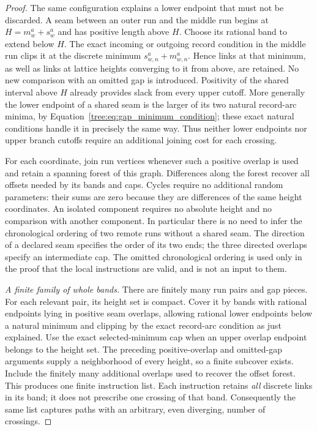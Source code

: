 \begin{proof}


The same configuration explains a lower endpoint that must not be
discarded.  A seam between an outer run and the middle run begins
at $H=m_w^a+s_w^a$ and has positive length above $H$.  Choose its
rational band to extend below $H$.  The exact incoming or outgoing
record condition in the middle run clips it at the discrete minimum
$s_{w,n}^a+m_{w,n}^a$.  Hence links at that minimum, as well as links
at lattice heights converging to it from above, are retained.  No
new comparison with an omitted gap is introduced.  Positivity of
the shared interval above $H$ already provides slack from every
upper cutoff.  More generally the lower endpoint of a shared seam
is the larger of its two natural record-arc minima, by
Equation~\eqref{tree:eq:gap_minimum_condition}; these exact natural
conditions handle it in precisely the same way.  Thus neither
lower endpoints nor upper branch cutoffs require an additional
joining cost for each crossing.

For each coordinate, join run vertices whenever such a positive
overlap is used and retain a spanning forest of this graph.  Differences
along the forest recover all offsets needed by its bands and caps.
Cycles require no additional random parameters: their sums are zero
because they are differences of the same height coordinates.  An
isolated component requires no absolute height and no comparison with
another component.  In particular there is no need to infer the
chronological ordering of two remote runs without a shared seam.
The direction of a declared seam specifies the order of its two ends;
the three directed overlaps specify an intermediate cap.  The omitted
chronological ordering is used only in the proof that the local
instructions are valid, and is not an input to them.

\emph{A finite family of whole bands.}
There are finitely many run pairs and gap pieces. For each relevant
pair, its height set is compact.  Cover it by bands with rational
endpoints lying in positive seam overlaps, allowing rational lower
endpoints below a natural minimum and clipping by the exact record-arc
condition as just explained.  Use the exact selected-minimum cap when
an upper overlap endpoint belongs to the height set.
The preceding positive-overlap and omitted-gap arguments supply a
neighborhood of every height, so a finite subcover exists.  Include
the finitely many additional overlaps used to recover the offset
forest.  This produces one finite instruction list.  Each instruction
retains \emph{all} discrete links in its band; it does not prescribe
one crossing of that band.  Consequently the same list captures paths
with an arbitrary, even diverging, number of crossings.


\end{proof}
